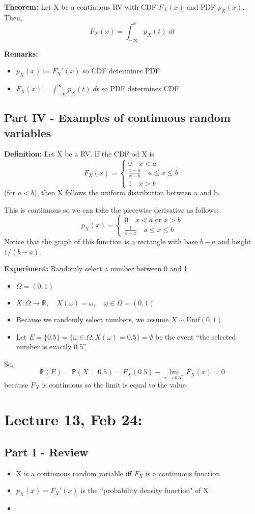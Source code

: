 \documentclass[12pt]{article}
\renewcommand{\P}{\mathbb{P}}
\begin{document}
\textbf{Theorem:} Let X be a continuous RV with CDF $F_X(x)$ and PDF $p_X(x)$. Then,
\[F_X(x) = \int_{-\infty}^x p_X(t) \; dt\]

\textbf{Remarks:}
\begin{itemize}
    \item $p_X(x) := F_X'(x)$ so CDF determines PDF
    \item $F_X(x) = \int_{-\infty}^\infty p_X(t)\; dt$ so PDF determines CDF
\end{itemize}

\subsection*{Part IV - Examples of continuous random variables}
\textbf{Definition:} Let X be a RV. If the CDF od X is 
\[F_X(x) = \begin{cases}
    0 \quad x < a\\
    \frac{x-a}{x- b} \quad a \leq x \leq b\\
    1 \quad x > b
\end{cases}\] 
(for $a < b$), then X follows the uniform distribution between a and b.

This is continuous so we can take the piecewise derivative as follows:
\[p_X(x) = \begin{cases}
    0 \quad x < a \text{ or } x > b\\
    \frac{1}{b - a} \quad a \leq x \leq b
\end{cases}\]
Notice that the graph of this function is a rectangle with base $b-a$ and height $1/(b-a)$.

\textbf{Experiment:} Randomly select a number between 0 and 1
\begin{itemize}
    \item $\Omega = (0, 1)$
    \item $X : \Omega \to \mathbb{R}, \quad X(\omega) = \omega, \quad \omega \in \Omega = (0, 1)$
    \item Because we randomly select numbers, we assume $X \sim \text{Unif}(0, 1)$
    \item Let $E = \{0.5\} = \{\omega \in \Omega: X(\omega) = 0.5\} = \emptyset$ be the event ``the selected number is exactly 0.5''
\end{itemize}
So, 
\[\P(E) = \P(X = 0.5) = F_X(0.5) - \lim_{x \to 0.5^-} F_X(x) = 0\]
because $F_X$ is continuous so the limit is equal to the value

\section*{Lecture 13, Feb 24: }
\subsection*{Part I - Review} 
\begin{itemize}
    \item X is a continuous random variable iff $F_X$ is a continuous function 
    \item $p_X(x) = F_X'(x)$ is the ``probability density function" of X 
    \item 
\end{itemize}
\end{document}
